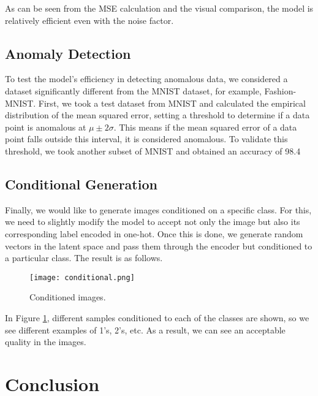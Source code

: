 \documentclass[twocolumn, 9pt]{article}
\begin{document}
As can be seen from the MSE calculation and the visual comparison, the model is relatively efficient even with the noise factor.

\subsection{Anomaly Detection}

To test the model's efficiency in detecting anomalous data, we considered a dataset significantly different from the MNIST dataset, for example, Fashion-MNIST. First, we took a test dataset from MNIST and calculated the empirical distribution of the mean squared error, setting a threshold to determine if a data point is anomalous at $\mu \pm 2\sigma$. This means if the mean squared error of a data point falls outside this interval, it is considered anomalous. To validate this threshold, we took another subset of MNIST and obtained an accuracy of 98.4%

\subsection{Conditional Generation}

Finally, we would like to generate images conditioned on a specific class. For this, we need to slightly modify the model to accept not only the image but also its corresponding label encoded in one-hot. Once this is done, we generate random vectors in the latent space and pass them through the encoder but conditioned to a particular class. The result is as follows.

\begin{figure}[ht]
\centering
\texttt{[image: conditional.png]}
\caption{Conditioned images.}
\label{fig:example5}
\end{figure}

In Figure \ref{fig:example5}, different samples conditioned to each of the classes are shown, so we see different examples of 1's, 2's, etc. As a result, we can see an acceptable quality in the images.

\section{Conclusion}
\end{document}
